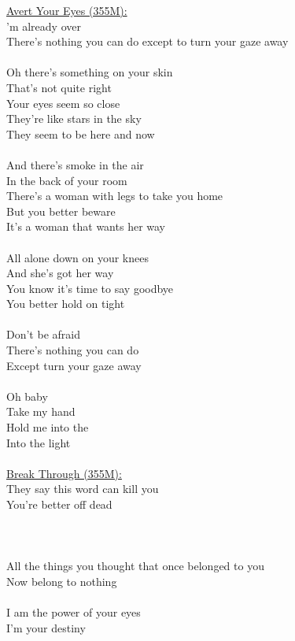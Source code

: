 \documentclass[11pt]{article}
\begin{document}
\underline{Avert Your Eyes (355M):}\\
'm already over\\
There's nothing you can do except to turn your gaze away\\
\\
Oh there's something on your skin\\
That's not quite right\\
Your eyes seem so close\\
They're like stars in the sky\\
They seem to be here and now\\
\\
And there's smoke in the air\\
In the back of your room\\
There's a woman with legs to take you home\\
But you better beware\\
It's a woman that wants her way\\
\\
All alone down on your knees\\
And she's got her way\\
You know it's time to say goodbye\\
You better hold on tight\\
\\
Don't be afraid\\
There's nothing you can do\\
Except turn your gaze away\\
\\
Oh baby\\
Take my hand\\
Hold me into the\\
Into the light\\
\\
\underline{Break Through (355M):}\\
They say this word can kill you\\
You're better off dead\\
\\
[Chorus]\\
\\
All the things you thought that once belonged to you\\
Now belong to nothing\\
\\
I am the power of your eyes\\
I'm your destiny\\
\\
\end{document}
